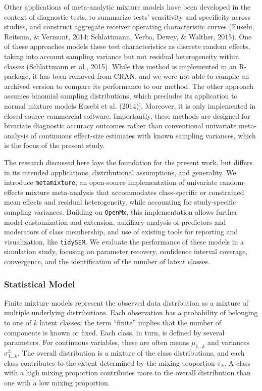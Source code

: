 \documentclass[
  english,
  man, noextraspace,floatsintext]{apa6}
\begin{document}
Other applications of meta-analytic mixture models have been developed in the context of diagnostic tests, to summarize tests' sensitivity and specificity across studies, and construct aggregate receiver operating characteristic curves (Eusebi, Reitsma, \& Vermunt, 2014; Schlattmann, Verba, Dewey, \& Walther, 2015).
One of these approaches models these test characteristics as discrete random effects, taking into account sampling variance but not residual heterogeneity within classes (Schlattmann et al., 2015).
While this method is implemented in an R-package, it has been removed from CRAN, and we were not able to compile an archived version to compare its performance to our method.
The other approach assumes binomial sampling distributions, which precludes its application to normal mixture models Eusebi et al. (2014){]}.
Moreover, it is only implemented in closed-source commercial software.
Importantly, these methods are designed for bivariate diagnostic accuracy outcomes rather than conventional univariate meta-analysis of continuous effect-size estimates with known sampling variances, which is the focus of the present study.

The research discussed here lays the foundation for the present work,
but differs in its intended applications, distributional assumptions, and generality.
We introduce \texttt{metamixture}, an open-source implementation of univariate random-effects mixture meta-analysis that accommodates class-specific or constrained mean effects and residual heterogeneity, while accounting for study-specific sampling variances.
Building on \texttt{OpenMx}, this implementation allows further model customization and extension, auxiliary analysis of predictors and moderators of class membership,
and use of existing tools for reporting and visualization, like \texttt{tidySEM}.
We evaluate the performance of these models in a simulation study, focusing on parameter recovery, confidence interval coverage, convergence, and the identification of the number of latent classes.

\subsubsection{Statistical Model}\label{statistical-model}

Finite mixture models represent the observed data distribution as a mixture of multiple underlying distributions.
Each observation has a probability of belonging to one of \(k\) latent classes;
the term ``finite'' implies that the number of components is known or fixed.
Each class, in turn, is defined by several parameters.
For continuous variables, these are often means \(\mu_{1 \ldots k}\) and variances \(\sigma^2_{1 \ldots k}\).
The overall distribution is a mixture of the class distributions, and each class contributes to the extent determined by the mixing proportion \(\pi_k\).
A class with a high mixing proportion contributes more to the overall distribution than one with a low mixing proportion.
\end{document}
